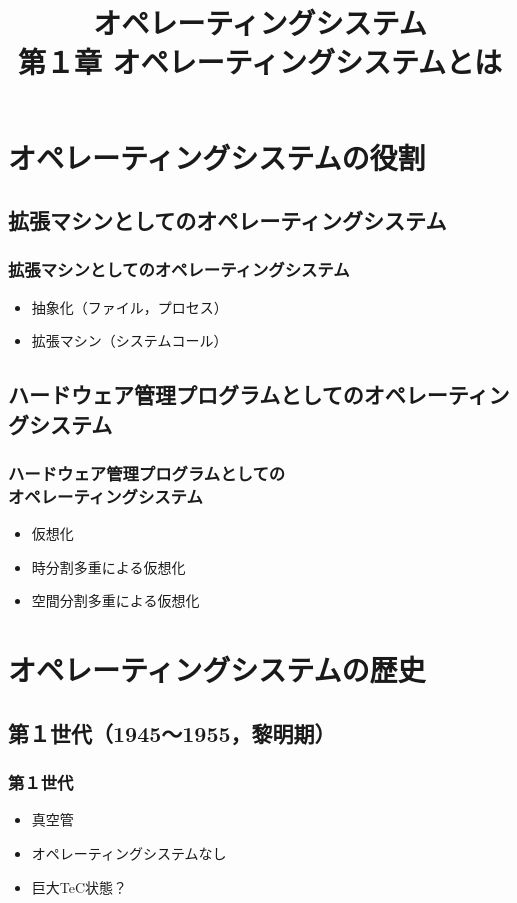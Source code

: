 \documentclass[dvipdfmx]{beamer}
\begin{document}
\title[OS]{オペレーティングシステム\\第１章 オペレーティングシステムとは}
\date{}

\begin{frame}
  \titlepage
\end{frame}


\section{オペレーティングシステムの役割}
\subsection{拡張マシンとしてのオペレーティングシステム}
\begin{frame}
  \frametitle{拡張マシンとしてのオペレーティングシステム}
  \begin{itemize}
    \item 抽象化（ファイル，プロセス）
    \item 拡張マシン（システムコール）
  \end{itemize}
\end{frame}

\subsection{ハードウェア管理プログラムとしてのオペレーティングシステム}
\begin{frame}
  \frametitle{ハードウェア管理プログラムとしての\\オペレーティングシステム}
  \begin{itemize}
    \item 仮想化
    \item 時分割多重による仮想化
    \item 空間分割多重による仮想化
  \end{itemize}
\end{frame}

\section{オペレーティングシステムの歴史}
\subsection{第１世代（1945〜1955，黎明期）}
\begin{frame}
  \frametitle{第１世代}
  \begin{itemize}
    \item 真空管
    \item オペレーティングシステムなし
    \item 巨大TeC状態？
  \end{itemize}
\end{frame}
\end{document}
